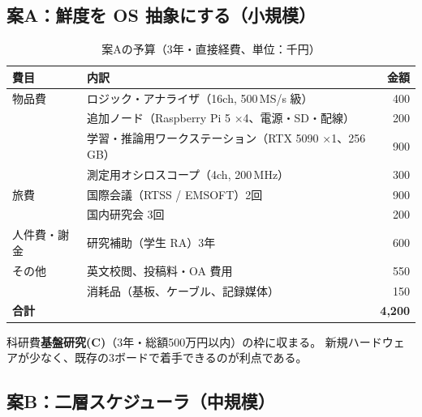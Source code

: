 \documentclass[11pt,a4paper]{article}
\newcommand{\keyp}[1]{\textbf{\textcolor{blue!45!black}{#1}}}
\begin{document}
\subsection{案A：鮮度を OS 抽象にする（小規模）}

\begin{table}[htbp]
\centering
\small
\caption{案Aの予算（3年・直接経費、単位：千円）}
\begin{tabularx}{\textwidth}{@{}l X r@{}}
\toprule
\textbf{費目} & \textbf{内訳} & \textbf{金額} \\
\midrule
物品費 & ロジック・アナライザ（16ch, 500\,MS/s 級） & 400 \\
       & 追加ノード（Raspberry Pi 5 ×4、電源・SD・配線） & 200 \\
       & 学習・推論用ワークステーション（RTX 5090 ×1、256\,GB） & 900 \\
       & 測定用オシロスコープ（4ch, 200\,MHz） & 300 \\
\midrule
旅費 & 国際会議（RTSS / EMSOFT）2回 & 900 \\
     & 国内研究会 3回 & 200 \\
\midrule
人件費・謝金 & 研究補助（学生 RA）3年 & 600 \\
\midrule
その他 & 英文校閲、投稿料・OA 費用 & 550 \\
       & 消耗品（基板、ケーブル、記録媒体） & 150 \\
\midrule
\textbf{合計} & & \textbf{4,200} \\
\bottomrule
\end{tabularx}
\end{table}

\noindent
科研費\keyp{基盤研究(C)}（3年・総額500万円以内）の枠に収まる。
新規ハードウェアが少なく、既存の3ボードで着手できるのが利点である。

\subsection{案B：二層スケジューラ（中規模）}
\end{document}
